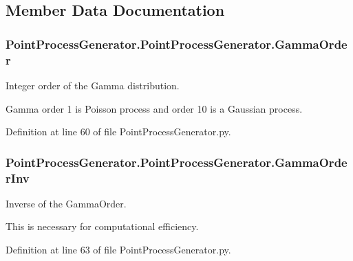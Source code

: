 \subsection{Member Data Documentation}
\subsubsection[{\texorpdfstring{Gamma\+Order}{GammaOrder}}]{\setlength{\rightskip}{0pt plus 5cm}Point\+Process\+Generator.\+Point\+Process\+Generator.\+Gamma\+Order}\hypertarget{class_point_process_generator_1_1_point_process_generator_aa6c6513cd7f00dbdceb5f945a07cffee}{}\label{class_point_process_generator_1_1_point_process_generator_aa6c6513cd7f00dbdceb5f945a07cffee}


Integer order of the Gamma distribution. 

Gamma order 1 is Poisson process and order 10 is a Gaussian process. 

Definition at line 60 of file Point\+Process\+Generator.\+py.

\subsubsection[{\texorpdfstring{Gamma\+Order\+Inv}{GammaOrderInv}}]{\setlength{\rightskip}{0pt plus 5cm}Point\+Process\+Generator.\+Point\+Process\+Generator.\+Gamma\+Order\+Inv}\hypertarget{class_point_process_generator_1_1_point_process_generator_aa70be756b1535ff4512affa05a732fda}{}\label{class_point_process_generator_1_1_point_process_generator_aa70be756b1535ff4512affa05a732fda}


Inverse of the Gamma\+Order. 

This is necessary for computational efficiency. 

Definition at line 63 of file Point\+Process\+Generator.\+py.

